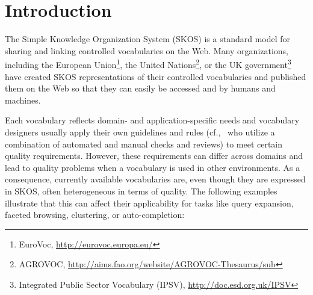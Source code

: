 
\section{Introduction}\label{sec:introduction}


The Simple Knowledge Organization System (SKOS) \cite{Miles2005} is a standard model for sharing and linking controlled vocabularies on the Web. Many organizations, including the European Union\footnote{EuroVoc, \url{http://eurovoc.europa.eu/}}, the United Nations\footnote{AGROVOC, \url{http://aims.fao.org/website/AGROVOC-Thesaurus/sub}}, or the UK government\footnote{Integrated Public Sector Vocabulary (IPSV), \url{http://doc.esd.org.uk/IPSV}} have created SKOS representations of their controlled vocabularies and published them on the Web so that they can easily be accessed and by humans and machines.

Each vocabulary reflects domain- and application-specific needs and vocabulary designers usually apply their own guidelines and rules (cf.,~\cite{Coronado2009} who utilize a combination of automated and manual checks and reviews) to meet certain quality requirements. However, these requirements can differ across domains and lead to quality problems when a vocabulary is used in other environments. As a consequence, currently available vocabularies are, even though they are expressed in SKOS, often heterogeneous in terms of quality. The following examples illustrate that this can affect their applicability for tasks like query expansion, faceted browsing, clustering, or auto-completion: 

